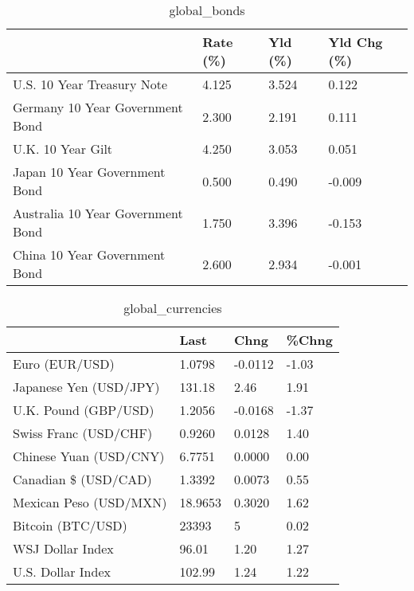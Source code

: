 \documentclass{article}%
\begin{document}
%


\begin{table}[htbp]%
\caption{global\_bonds}%
\centering%
\begin{adjustbox}{width=1\textwidth}%
\begin{tabular}{llll}
\toprule
                                  & Rate (\%) & Yld (\%) & Yld Chg (\%) \\
\midrule
       U.S. 10 Year Treasury Note &    4.125 &   3.524 &       0.122 \\
  Germany 10 Year Government Bond &    2.300 &   2.191 &       0.111 \\
                U.K. 10 Year Gilt &    4.250 &   3.053 &       0.051 \\
    Japan 10 Year Government Bond &    0.500 &   0.490 &      -0.009 \\
Australia 10 Year Government Bond &    1.750 &   3.396 &      -0.153 \\
    China 10 Year Government Bond &    2.600 &   2.934 &      -0.001 \\
\bottomrule
\end{tabular}
%
\end{adjustbox}%
\end{table}

%


\begin{table}[htbp]%
\caption{global\_currencies}%
\centering%
\begin{adjustbox}{width=1\textwidth}%
\begin{tabular}{llll}
\toprule
                       &    Last &    Chng & \%Chng \\
\midrule
        Euro (EUR/USD) &  1.0798 & -0.0112 & -1.03 \\
Japanese Yen (USD/JPY) &  131.18 &    2.46 &  1.91 \\
  U.K. Pound (GBP/USD) &  1.2056 & -0.0168 & -1.37 \\
 Swiss Franc (USD/CHF) &  0.9260 &  0.0128 &  1.40 \\
Chinese Yuan (USD/CNY) &  6.7751 &  0.0000 &  0.00 \\
  Canadian \$ (USD/CAD) &  1.3392 &  0.0073 &  0.55 \\
Mexican Peso (USD/MXN) & 18.9653 &  0.3020 &  1.62 \\
     Bitcoin (BTC/USD) &   23393 &       5 &  0.02 \\
      WSJ Dollar Index &   96.01 &    1.20 &  1.27 \\
     U.S. Dollar Index &  102.99 &    1.24 &  1.22 \\
\bottomrule
\end{tabular}
%
\end{adjustbox}%
\end{table}
\end{document}
